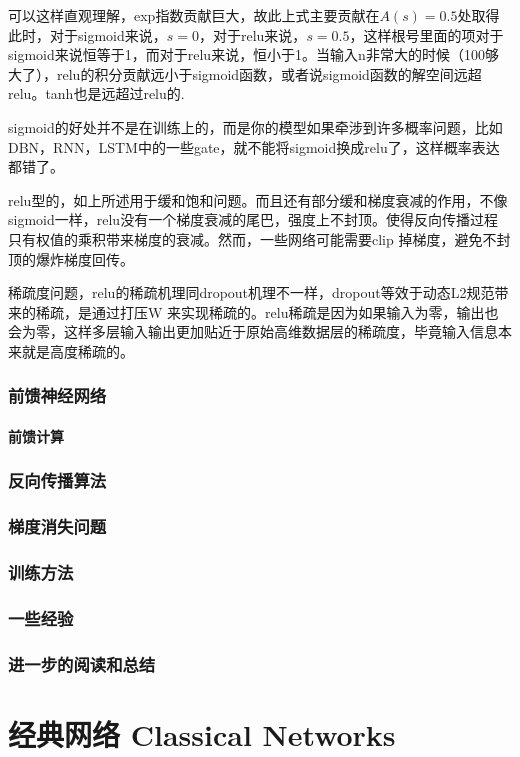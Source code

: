 \documentclass[11pt,fleqn, UTF8]{ctexbook} %
\begin{document}
可以这样直观理解，exp指数贡献巨大，故此上式主要贡献在$A(s)=0.5$处取得此时，对于sigmoid来说，$s=0$，对于relu来说，$s=0.5$，这样根号里面的项对于sigmoid来说恒等于1，而对于relu来说，恒小于1。当输入n非常大的时候（100够大了），relu的积分贡献远小于sigmoid函数，或者说sigmoid函数的解空间远超relu。tanh也是远超过relu的.

sigmoid的好处并不是在训练上的，而是你的模型如果牵涉到许多概率问题，比如DBN，RNN，LSTM中的一些gate，就不能将sigmoid换成relu了，这样概率表达都错了。

relu型的，如上所述用于缓和饱和问题。而且还有部分缓和梯度衰减的作用，不像sigmoid一样，relu没有一个梯度衰减的尾巴，强度上不封顶。使得反向传播过程只有权值的乘积带来梯度的衰减。然而，一些网络可能需要clip 掉梯度，避免不封顶的爆炸梯度回传。

稀疏度问题，relu的稀疏机理同dropout机理不一样，dropout等效于动态L2规范带来的稀疏，是通过打压W 来实现稀疏的。relu稀疏是因为如果输入为零，输出也会为零，这样多层输入输出更加贴近于原始高维数据层的稀疏度，毕竟输入信息本来就是高度稀疏的。
\section{前馈神经网络}
\subsection{前馈计算}
\section{反向传播算法}
\section{梯度消失问题}

\section{训练方法}
\section{一些经验}
\section{进一步的阅读和总结}

\part{经典网络 Classical Networks}
\end{document}

